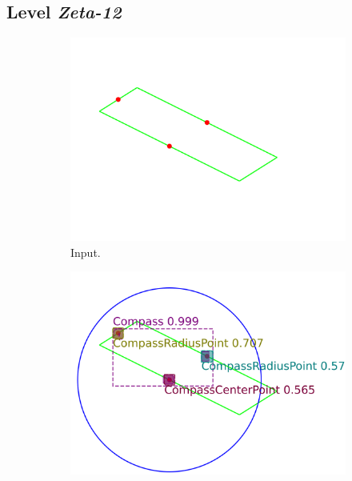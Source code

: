 \subsection{Level \textit{Zeta-12}}
\begin{figure}[htb!]
     \centering
     \begin{subfigure}[t]{0.32\textwidth}
         \centering
         \includegraphics[width=\textwidth]{img/Zeta-06_example/input_image0.png}
         \caption{\small Input.}
         \label{fig:Zeta06_example_input}
     \end{subfigure}
     \hfill
     \begin{subfigure}[t]{0.32\textwidth}
         \centering
         \includegraphics[width=\textwidth]{img/Zeta-06_example/output_image0.png}

\end{subfigure}
\end{figure}
